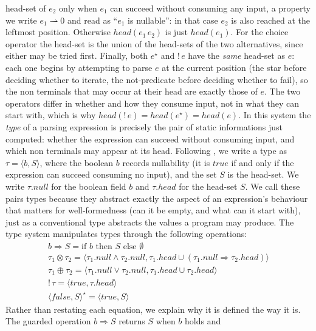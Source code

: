 \documentclass[preprint,12pt]{elsarticle}
\theoremstyle{definition}
\begin{document}
head-set of $e_2$ only when $e_1$ can succeed without consuming any input, a
property we write $e_1 \rightharpoonup 0$ and read as ``$e_1$ is nullable'': in
that case $e_2$ is also reached at the leftmost position. Otherwise
$head(e_1\,e_2)$ is just $head(e_1)$. For the choice operator the head-set is the
union of the head-sets of the two alternatives, since either may be tried first.
Finally, both $e^\star$ and $!\,e$ have the \emph{same} head-set as $e$: each one
begins by attempting to parse $e$ at the current position (the star before deciding whether to iterate, the not-predicate before deciding whether to fail), so the non terminals that may occur at their head are exactly those of $e$. The
two operators differ in whether and how they consume input, not in what they can
start with, which is why $head(!\,e) = head(e^\star) = head(e)$.
In this system the \emph{type} of a parsing expression is precisely the pair of
static informations just computed: whether the expression can succeed without
consuming input, and which non terminals may appear at its head. Following
\cite{Ribeiro19}, we write a type as $\tau = \langle b, S \rangle$, where the
boolean $b$ records nullability (it is $true$ if and only if the expression can succeed consuming no input), and the set $S$ is the head-set. We write
$\tau.null$ for the boolean field $b$ and $\tau.head$ for the head-set $S$. We
call these pairs types because they abstract exactly the aspect of an
expression's behaviour that matters for well-formedness (can it be empty, and what
can it start with), just as a conventional type abstracts the values a program may
produce. The type system manipulates types through the following operations:
\[
  \begin{array}{l}
    b \Rightarrow S = \text{if } b \text{ then } S \text{ else }\emptyset\\
    \tau_1 \otimes \tau_2 = \langle \tau_1.null \land \tau_2.null,
                                \tau_1.head \cup (\tau_1.null \Rightarrow \tau_2.head) \rangle \\
    \tau_1 \oplus \tau_2 = \langle \tau_1.null \lor \tau_2.null,
                                \tau_1.head \cup \tau_2.head\rangle\\
    !\,\tau = \langle true , \tau.head \rangle\\
    \langle false, S \rangle^\star = \langle true, S \rangle
  \end{array}
\]
Rather than restating each equation, we explain why it is defined the way it is.
The guarded operation $b \Rightarrow S$ returns $S$ when $b$ holds and
\end{document}
